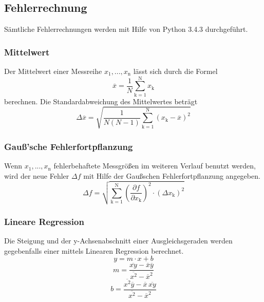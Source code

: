 \subsection{Fehlerrechnung}
\label{sec:Fehler}
Sämtliche Fehlerrechnungen werden mit Hilfe von Python 3.4.3 durchgeführt.
\subsubsection{Mittelwert}
Der Mittelwert einer Messreihe $x_\text{1}, ... ,x_\text{n}$ lässt sich durch die Formel
\begin{equation}
        \overline{x} = \frac{1}{N} \sum_{\text{k}=1}^\text{N} x_\text{k}
\end{equation}
berechnen. Die Standardabweichung des Mittelwertes beträgt
\begin{equation}
        \Delta \overline{x} = \sqrt{ \frac{1}{N(N-1)} \sum_{\text{k}=1}^\text{N} (x_\text{k} - \overline{x})^2}
\end{equation}

\subsubsection{Gauß'sche Fehlerfortpflanzung}
Wenn $x_\text{1}, ..., x_\text{n}$ fehlerbehaftete Messgrößen im weiteren Verlauf benutzt werden, wird der neue Fehler $\Delta f$ mit Hilfe der Gaußschen Fehlerfortpflanzung angegeben.
\begin{equation}
        \label{eqn:Gauß}
	\Delta f = \sqrt{\sum_{\text{k}=1}^\text{N} \left( \frac{ \partial f}{\partial x_\text{k}} \right) ^2 \cdot (\Delta x_\text{k})^2}
\end{equation}

\subsubsection{Lineare Regression}
Die Steigung und der y-Achsenabschnitt einer Ausgleichsgeraden werden gegebenfalls einer mittels Linearen Regression berechnet.
\begin{equation}
        y = m \cdot x + b
\end{equation}
\begin{equation}
	\label{eqn:m}
        m = \frac{ \overline{xy} - \overline{x} \overline{y} } {\overline{x^2} - \overline{x}^2}
\end{equation}
\begin{equation}
	\label{eqn:b}
        b = \frac{ \overline{x^2}\overline{y} - \overline{x} \, \overline{xy}} { \overline{x^2} - \overline{x}^2}
\end{equation}
\newpage
